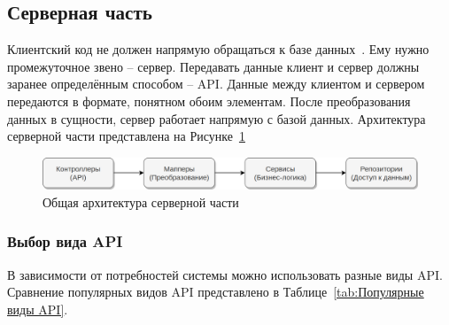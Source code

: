\documentclass[a4paper,article]{article}
\begin{document}
\begin{sloppypar}
    \newpage

    \subsection{Серверная часть}

    Клиентский код не должен напрямую обращаться к базе данных~\cite{baeldungbook, webapi, cleanarch}. Ему нужно промежуточное звено -- сервер. Передавать данные клиент и сервер должны заранее определённым способом -- API. Данные между клиентом и сервером передаются в формате, понятном обоим элементам. После преобразования данных в сущности, сервер работает напрямую с базой данных. Архитектура серверной части представлена на Рисунке~\ref{fig:Архитектура серверной части}

    \begin{figure}[h]
        \centering
        \includegraphics[width=0.9\linewidth]{Архитектура серверной части.png}
        \caption{\centering Общая архитектура серверной части}
        \label{fig:Архитектура серверной части}
    \end{figure}
    
    \vspace{-1em}

    \subsubsection{Выбор вида API}\label{Выбор вида API}

    В зависимости от потребностей системы можно использовать разные виды API. Сравнение популярных видов API представлено в Таблице~\ref{tab:Популярные виды API}.


\end{sloppypar}
\end{document}
